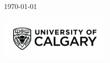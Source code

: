 \begin{titlepage}
    
    \vfill\vfill\vfill %
    
    {\large \today} %
    
    
    \vfill\vfill
    \includegraphics[width=0.4\textwidth]{./uc-logo.jpg}\\[1cm] %
     
    
    \vfill %
    
\end{titlepage}